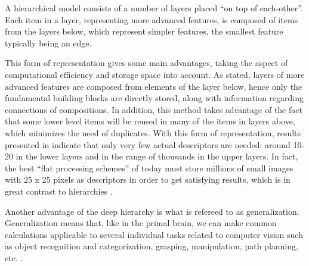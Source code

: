 A hierarchical model consists of a number of layers placed “on top of each-other”.
Each item in a layer, representing more advanced features,
is composed of items from the layers below, which represent simpler features,
the smallest feature typically being an edge.

This form of representation gives some main advantages,
taking the aspect of computational efficiency and storage space into account.
As stated, layers of more advanced features are composed from elements of the layer below,
hence only the fundamental building blocks are directly stored,
along with information regarding connections of compositions.
In addition, this method takes advantage of the fact that some lower level items
will be reused in many of the items in layers above, which minimizes the need of duplicates.
With this form of representation, results presented in \citet{fidler2009learning} indicate that
only very few actual descriptors are needed: around 10-20 in the lower layers
and in the range of thousands in the upper layers.
In fact, the best “flat processing schemes” of today must store millions of small images
with 25 x 25 pixels as descriptors in order to get satisfying results,
which is in great contrast to hierarchies \citep{fidler2009learning}.

Another advantage of the deep hierarchy is what is refereed to as generalization.
Generalization means that, like in the primal brain,
we can make common calculations applicable to several individual tasks
related to computer vision such as object recognition and categorization,
grasping, manipulation, path planning, etc. \citep{kruger2013deep}.
